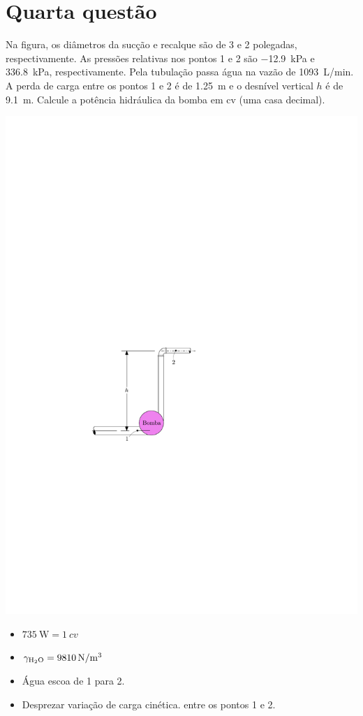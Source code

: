 \documentclass[a4paper, 12pt, brazilian]{article}
\begin{document}
	\section{Quarta questão}
	Na figura, os diâmetros da sucção e recalque são de 3 e 2 polegadas, respectivamente. As pressões relativas nos pontos 1 e 2 são \SI{-12.9}{\kilo\pascal} e \SI{336.8}{\kilo\pascal}, respectivamente. Pela tubulação passa água na vazão de \SI{1093}{\liter/\minute}. A perda de carga entre os pontos 1 e 2 é de \SI{1.25}{\meter} e o desnível vertical $h$ é de \SI{9.1}{\meter}. Calcule a potência hidráulica da bomba em cv (uma casa decimal).
	\begin{center}
		\includegraphics[width=.55\linewidth]{assets/images/ex4}
	\end{center}
	\begin{itemize}
		\item $\SI{735}{\watt}=\SI{1}{cv}$
		\item $\gamma_{\ce{H2O}}=\SI{9810}{\newton/\meter^{3}}$
		\item Água escoa de 1 para 2.
		\item Desprezar variação de carga cinética. entre os pontos 1 e 2.
	\end{itemize}
\end{document}
